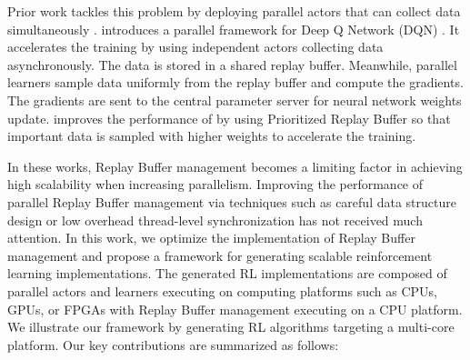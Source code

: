 Prior work tackles this problem by deploying parallel actors that can collect data simultaneously \cite{gorila, apex, a3c, impala}. \cite{gorila} introduces a parallel framework for Deep Q Network (DQN) \cite{dqn}. 
It accelerates the training by using independent actors collecting data asynchronously. The data is stored in a shared replay buffer. 
Meanwhile, parallel learners sample data uniformly from the replay buffer and compute the gradients. 
The gradients are sent to the central parameter server \cite{parameter_server} for neural network weights update.
\cite{apex} improves the performance of \cite{gorila} by using Prioritized Replay Buffer so that important data is sampled with higher weights to accelerate the training.

In these works, Replay Buffer management becomes a limiting factor in achieving high scalability when increasing parallelism. Improving the performance of parallel Replay Buffer management via techniques such as careful data structure design or low overhead thread-level synchronization has not received much attention. In this work, we optimize the implementation of Replay Buffer management and propose a framework for generating scalable reinforcement learning implementations. The generated RL implementations are composed of parallel actors and learners executing on computing platforms such as CPUs, GPUs, or FPGAs with Replay Buffer management executing on a CPU platform. We illustrate our framework by generating RL algorithms targeting a multi-core platform. Our key contributions are summarized as follows:
